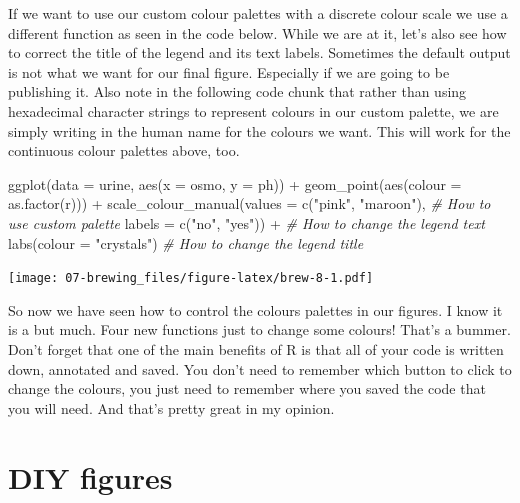 \documentclass[
]{book}
\newenvironment{Shaded}{\begin{snugshade}}{\end{snugshade}}
\newcommand{\AttributeTok}[1]{\textcolor[rgb]{0.77,0.63,0.00}{#1}}
\newcommand{\CommentTok}[1]{\textcolor[rgb]{0.56,0.35,0.01}{\textit{#1}}}
\newcommand{\FunctionTok}[1]{\textcolor[rgb]{0.00,0.00,0.00}{#1}}
\newcommand{\NormalTok}[1]{#1}
\newcommand{\SpecialCharTok}[1]{\textcolor[rgb]{0.00,0.00,0.00}{#1}}
\newcommand{\StringTok}[1]{\textcolor[rgb]{0.31,0.60,0.02}{#1}}
\begin{document}
If we want to use our custom colour palettes with a discrete colour scale we use a different function as seen in the code below. While we are at it, let's also see how to correct the title of the legend and its text labels. Sometimes the default output is not what we want for our final figure. Especially if we are going to be publishing it. Also note in the following code chunk that rather than using hexadecimal character strings to represent colours in our custom palette, we are simply writing in the human name for the colours we want. This will work for the continuous colour palettes above, too.

\begin{Shaded}
\begin{Highlighting}[]
\FunctionTok{ggplot}\NormalTok{(}\AttributeTok{data =}\NormalTok{ urine, }\FunctionTok{aes}\NormalTok{(}\AttributeTok{x =}\NormalTok{ osmo, }\AttributeTok{y =}\NormalTok{ ph)) }\SpecialCharTok{+}
  \FunctionTok{geom\_point}\NormalTok{(}\FunctionTok{aes}\NormalTok{(}\AttributeTok{colour =} \FunctionTok{as.factor}\NormalTok{(r))) }\SpecialCharTok{+}
  \FunctionTok{scale\_colour\_manual}\NormalTok{(}\AttributeTok{values =} \FunctionTok{c}\NormalTok{(}\StringTok{"pink"}\NormalTok{, }\StringTok{"maroon"}\NormalTok{), }\CommentTok{\# How to use custom palette}
                     \AttributeTok{labels =} \FunctionTok{c}\NormalTok{(}\StringTok{"no"}\NormalTok{, }\StringTok{"yes"}\NormalTok{)) }\SpecialCharTok{+} \CommentTok{\# How to change the legend text}
  \FunctionTok{labs}\NormalTok{(}\AttributeTok{colour =} \StringTok{"crystals"}\NormalTok{) }\CommentTok{\# How to change the legend title}
\end{Highlighting}
\end{Shaded}

\texttt{[image: 07-brewing\_files/figure-latex/brew-8-1.pdf]}

So now we have seen how to control the colours palettes in our figures. I know it is a but much. Four new functions just to change some colours! That's a bummer. Don't forget that one of the main benefits of R is that all of your code is written down, annotated and saved. You don't need to remember which button to click to change the colours, you just need to remember where you saved the code that you will need. And that's pretty great in my opinion.

\hypertarget{diy-figures}{%
\section{DIY figures}\label{diy-figures}}
\end{document}
